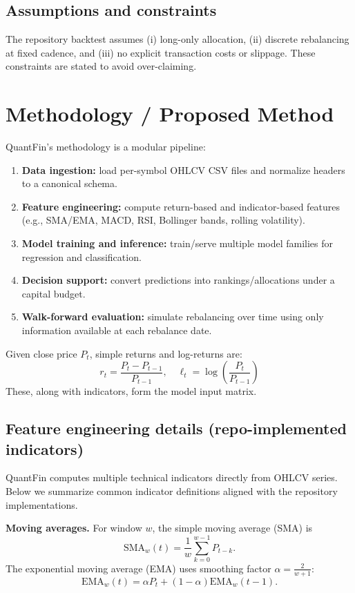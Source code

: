 \documentclass[conference]{IEEEtran}
\begin{document}
\subsection{Assumptions and constraints}
The repository backtest assumes (i) long-only allocation, (ii) discrete rebalancing at fixed cadence, and (iii) no explicit transaction costs or slippage. These constraints are stated to avoid over-claiming.

\section{Methodology / Proposed Method}\label{sec:method}
QuantFin's methodology is a modular pipeline:
\begin{enumerate}
\item \textbf{Data ingestion:} load per-symbol OHLCV CSV files and normalize headers to a canonical schema.
\item \textbf{Feature engineering:} compute return-based and indicator-based features (e.g., SMA/EMA, MACD, RSI, Bollinger bands, rolling volatility).
\item \textbf{Model training and inference:} train/serve multiple model families for regression and classification.
\item \textbf{Decision support:} convert predictions into rankings/allocations under a capital budget.
\item \textbf{Walk-forward evaluation:} simulate rebalancing over time using only information available at each rebalance date.
\end{enumerate}

Given close price $P_t$, simple returns and log-returns are:
\begin{equation}
 r_t = \frac{P_t - P_{t-1}}{P_{t-1}},\quad \ell_t = \log\left(\frac{P_t}{P_{t-1}}\right)
\end{equation}
These, along with indicators, form the model input matrix.

\subsection{Feature engineering details (repo-implemented indicators)}
QuantFin computes multiple technical indicators directly from OHLCV series. Below we summarize common indicator definitions aligned with the repository implementations.

\textbf{Moving averages.} For window $w$, the simple moving average (SMA) is
\begin{equation}
\mathrm{SMA}_w(t)=\frac{1}{w}\sum_{k=0}^{w-1} P_{t-k}.
\end{equation}
The exponential moving average (EMA) uses smoothing factor $\alpha=\tfrac{2}{w+1}$:
\begin{equation}
\mathrm{EMA}_w(t)=\alpha P_t + (1-\alpha)\mathrm{EMA}_w(t-1).
\end{equation}
\end{document}
